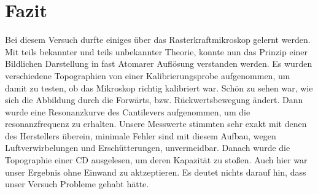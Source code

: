 \chapter{Fazit}

Bei diesem Versuch durfte einiges über das Rasterkraftmikroskop gelernt werden.
Mit teils bekannter und teils unbekannter Theorie, konnte nun das Prinzip einer Bildlichen Darstellung in fast Atomarer Auflösung verstanden werden.
Es wurden verschiedene Topographien von einer Kalibrierungsprobe aufgenommen, um damit zu testen, ob das Mikroskop richtig kalibriert war.
Schön zu sehen war, wie sich die Abbildung durch die Forwärts, bzw. Rückwertsbewegung ändert.
Dann wurde eine Resonanzkurve des Cantilevers aufgenommen, um die resonanzfrequenz zu erhalten.
Unsere Messwerte stimmten sehr exakt mit denen des Herstellers überein, minimale Fehler sind mit diesem Aufbau, wegen Luftverwirbelungen und Erschütterungen, unvermeidbar.
Danach wurde die Topographie einer CD ausgelesen, um deren Kapazität zu stoßen.
Auch hier war unser Ergebnis ohne Einwand zu aktzeptieren.
Es deutet nichts darauf hin, dass unser Versuch Probleme gehabt hätte.
